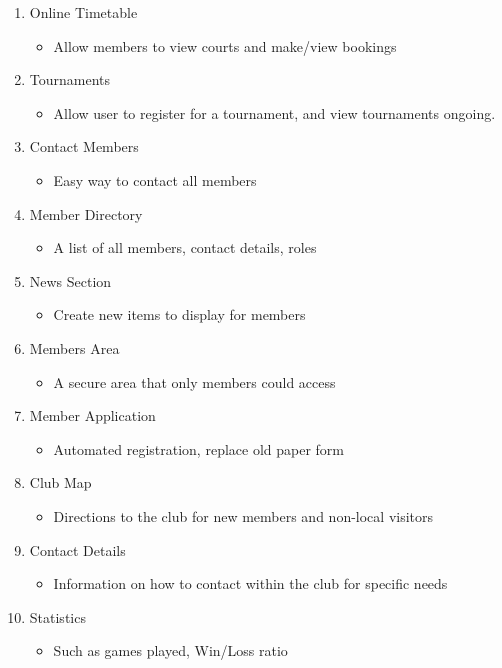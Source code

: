 \begin{enumerate}
\item Online Timetable
\begin{itemize}
\item Allow members to view courts and make/view bookings
\end{itemize}
\item Tournaments
\begin{itemize}
\item Allow user to register for a tournament, and view tournaments ongoing.
\end{itemize}
\item Contact Members
\begin{itemize}
\item Easy way to contact all members
\end{itemize}
\item Member Directory
\begin{itemize}
\item A list of all members, contact details, roles
\end{itemize}
\item News Section
\begin{itemize}
\item Create new items to display for members
\end{itemize}
\item Members Area
\begin{itemize}
\item A secure area that only members could access
\end{itemize}
\item Member Application
\begin{itemize}
\item Automated registration, replace old paper form
\end{itemize}
\item Club Map
\begin{itemize}
\item Directions to the club for new members and non-local visitors
\end{itemize}
\item Contact Details
\begin{itemize}
\item Information on how to contact within the club for specific needs
\end{itemize}
\item Statistics
\begin{itemize}
\item Such as games played, Win/Loss ratio
\end{itemize}
\end{enumerate}
